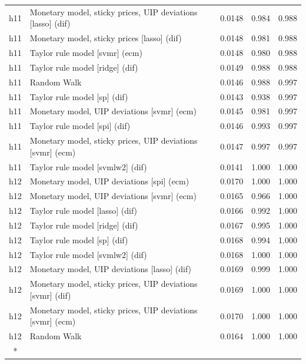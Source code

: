 \begin{ThreePartTable}
\begin{longtable}[t]{cp{5.5cm}ccc}
h11 & \raggedright Monetary model, sticky prices, UIP deviations [lasso] (dif) & 0.0148 & 0.984 & 0.988\\
h11 & \raggedright Monetary model, sticky prices [lasso] (dif) & 0.0148 & 0.981 & 0.988\\
h11 & \raggedright Taylor rule model [svmr] (ecm) & 0.0148 & 0.980 & 0.988\\
h11 & \raggedright Taylor rule model [ridge] (dif) & 0.0149 & 0.988 & 0.988\\
h11 & \raggedright Random Walk & 0.0146 & 0.988 & 0.997\\
h11 & \raggedright Taylor rule model [sp] (dif) & 0.0143 & 0.938 & 0.997\\
h11 & \raggedright Monetary model, UIP deviations [svmr] (ecm) & 0.0145 & 0.981 & 0.997\\
h11 & \raggedright Taylor rule model [spi] (dif) & 0.0146 & 0.993 & 0.997\\
h11 & \raggedright Monetary model, sticky prices, UIP deviations [svmr] (ecm) & 0.0147 & 0.997 & 0.997\\
h11 & \raggedright Taylor rule model [svmlw2] (dif) & 0.0141 & 1.000 & 1.000\\
\addlinespace
h12 & \raggedright Monetary model, UIP deviations [spi] (ecm) & 0.0170 & 1.000 & 1.000\\
h12 & \raggedright Monetary model, UIP deviations [svmr] (ecm) & 0.0165 & 0.966 & 1.000\\
h12 & \raggedright Taylor rule model [lasso] (dif) & 0.0166 & 0.992 & 1.000\\
h12 & \raggedright Taylor rule model [ridge] (dif) & 0.0167 & 0.995 & 1.000\\
h12 & \raggedright Taylor rule model [sp] (dif) & 0.0168 & 0.994 & 1.000\\
h12 & \raggedright Taylor rule model [svmlw2] (dif) & 0.0168 & 1.000 & 1.000\\
h12 & \raggedright Monetary model, UIP deviations [lasso] (dif) & 0.0169 & 0.999 & 1.000\\
h12 & \raggedright Monetary model, sticky prices, UIP deviations [svmr] (dif) & 0.0169 & 1.000 & 1.000\\
h12 & \raggedright Monetary model, sticky prices, UIP deviations [svmr] (ecm) & 0.0170 & 1.000 & 1.000\\
h12 & \raggedright Random Walk & 0.0164 & 1.000 & 1.000\\*
\end{longtable}
\end{ThreePartTable}
\endgroup{}
